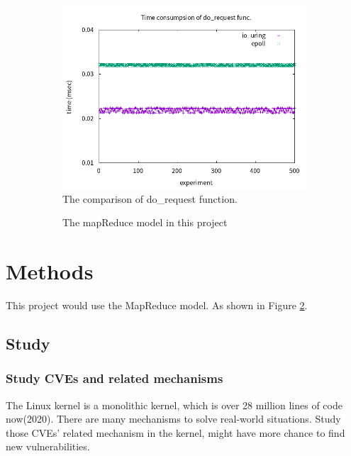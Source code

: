 \documentclass[12pt,a4paper]{article}
\begin{document}
\begin{figure}
  \centering
  \begin{subfigure}{.45\linewidth}
    \includegraphics[width=.99\textwidth]{io_uring.png}
    \caption{The comparison of do\_request function.}
    \label{fig:iouring}
  \end{subfigure}
  \begin{subfigure}{.45\linewidth}
    \caption[]{The mapReduce model in this project}
    \label{Fig:model}
  \end{subfigure}
  \caption{}
  \label{Fig:dummy}
\end{figure}

\section{Methods}
This project would use the MapReduce model. As shown in Figure \ref*{Fig:model}.

\subsection{Study}
\subsubsection{Study CVEs and related mechanisms}
The Linux kernel is a monolithic kernel, which is over 28 million lines of code now(2020). There
are many mechanisms to solve real-world situations. Study those CVEs' related mechanism in the
kernel, might have more chance to find new vulnerabilities.
\end{document}
